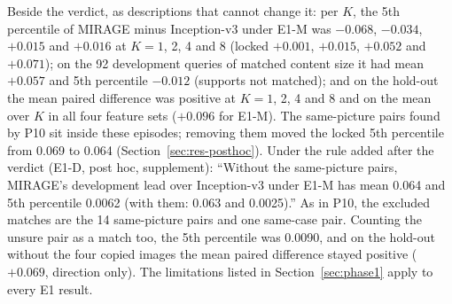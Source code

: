 \documentclass[conference]{IEEEtran}
\begin{document}
Beside the verdict, as descriptions that cannot change it: per $K$, the 5th percentile of MIRAGE minus Inception-v3 under E1-M was $-0.068$, $-0.034$, $+0.015$ and $+0.016$ at $K=1$, 2, 4 and 8 (locked $+0.001$, $+0.015$, $+0.052$ and $+0.071$); on the 92 development queries of matched content size it had mean $+0.057$ and 5th percentile $-0.012$ (supports not matched); and on the hold-out the mean paired difference was positive at $K=1$, 2, 4 and 8 and on the mean over $K$ in all four feature sets ($+0.096$ for E1-M). The same-picture pairs found by P10 sit inside these episodes; removing them moved the locked 5th percentile from 0.069 to 0.064 (Section~\ref{sec:res-posthoc}). Under the rule added after the verdict (E1-D, post hoc, supplement): ``Without the same-picture pairs, MIRAGE's development lead over Inception-v3 under E1-M has mean 0.064 and 5th percentile 0.0062 (with them: 0.063 and 0.0025).'' As in P10, the excluded matches are the 14 same-picture pairs and one same-case pair. Counting the unsure pair as a match too, the 5th percentile was 0.0090, and on the hold-out without the four copied images the mean paired difference stayed positive ($+0.069$, direction only). The limitations listed in Section~\ref{sec:phase1} apply to every E1 result.
\end{document}
